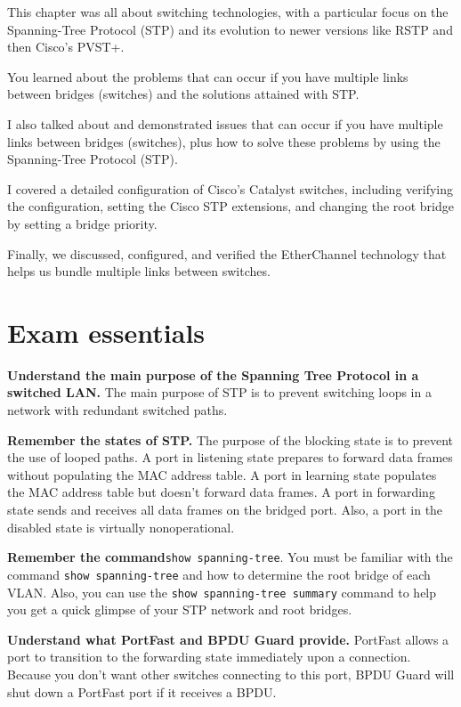 This chapter was all about switching technologies, with a particular focus on the Spanning-Tree Protocol (STP) and its evolution to newer
versions like RSTP and then Cisco's PVST+.

You learned about the problems that can occur if you have multiple links between bridges (switches) and the solutions attained with STP.

I also talked about and demonstrated issues that can occur if you have multiple links between bridges (switches), plus how to solve these
problems by using the Spanning-Tree Protocol (STP).

I covered a detailed configuration of Cisco's Catalyst switches, including verifying the configuration, setting the Cisco STP extensions,
and changing the root bridge by setting a bridge priority.

Finally, we discussed, configured, and verified the EtherChannel technology that helps us bundle multiple links between switches.




\section{Exam essentials}

\textbf{Understand the main purpose of the Spanning Tree Protocol in a
switched LAN.} The main purpose of STP is to prevent switching loops in
a network with redundant switched paths.

\textbf{Remember the states of STP.} The purpose of the blocking state
is to prevent the use of looped paths. A port in listening state
prepares to forward data frames without populating the MAC address
table. A port in learning state populates the MAC address table but
doesn't forward data frames. A port in forwarding state sends and
receives all data frames on the bridged port. Also, a port in the
disabled state is virtually nonoperational.

\textbf{Remember the command}\texttt{show\ spanning-tree}. You must be
familiar with the command \texttt{show\ spanning-tree} and how to
determine the root bridge of each VLAN. Also, you can use the
\texttt{show\ spanning-tree\ summary} command to help you get a quick
glimpse of your STP network and root bridges.

\textbf{Understand what PortFast and BPDU Guard provide.} PortFast
allows a port to transition to the forwarding state immediately upon a
connection. Because you don't want other switches connecting to this
port, BPDU Guard will shut down a PortFast port if it receives a BPDU.

